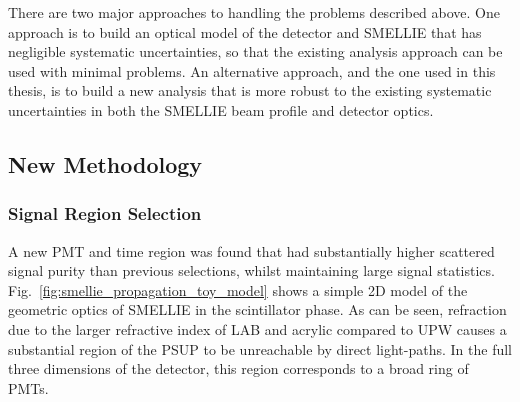 There are two major approaches to handling the problems described above. One approach is to build an optical model of the detector and SMELLIE that has negligible systematic uncertainties, so that the existing analysis approach can be used with minimal problems. An alternative approach, and the one used in this thesis, is to build a new analysis that is more robust to the existing systematic uncertainties in both the SMELLIE beam profile and detector optics.


\subsection{New Methodology}\label{sec:smellie_scatt_new_method}
\subsubsection{Signal Region Selection}
A new PMT and time region was found that had substantially higher scattered signal purity than previous selections, whilst maintaining large signal statistics. Fig.~\ref{fig:smellie_propagation_toy_model} shows a simple 2D model of the geometric optics of SMELLIE in the scintillator phase. As can be seen, refraction due to the larger refractive index of LAB and acrylic compared to UPW causes a substantial region of the PSUP to be unreachable by direct light-paths. In the full three dimensions of the detector, this region corresponds to a broad ring of PMTs.


